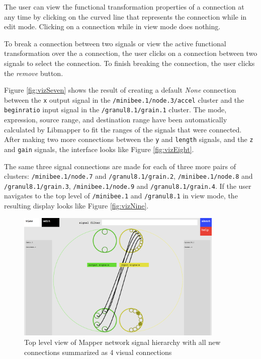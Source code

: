 The user can view the functional transformation properties of a connection at any time by clicking on the curved line that represents the connection while in edit mode. Clicking on a connection while in view mode does nothing.

To break a connection between two signals or view the active functional transformation over the a connection, the user clicks on a connection between two signals to select the connection. To finish breaking the connection, the user clicks the \emph{remove} button.

Figure \ref{fig:vizSeven} shows the result of creating a default \emph{None} connection between the \verb#x# output signal in the \verb#/minibee.1/node.3/accel# cluster and the \verb#beginratio# input signal in the \verb#/granul8.1/grain.1# cluster. The mode, expression, source range, and destination range have been automatically calculated by Libmapper to fit the ranges of the signals that were connected. After making two more connections between the \verb#y# and \verb#length# signals, and the \verb#z# and \verb#gain# signals, the interface looks like Figure \ref{fig:vizEight}.

The same three signal connections are made for each of three more pairs of clusters: \verb#/minibee.1/node.7# and \verb#/granul8.1/grain.2#, \verb#/minibee.1/node.8# and \verb#/granul8.1/grain.3#, \verb#/minibee.1/node.9# and \verb#/granul8.1/grain.4#. If the user navigates to the top level of \verb#/minibee.1# and \verb#/granul8.1# in view mode, the resulting display looks like Figure \ref{fig:vizNine}.

\begin{figure}[hp]
\centering
\includegraphics[width=0.88\textwidth]{vizmapperTen.png}
\caption{Top level view of Mapper network signal hierarchy with all new connections summarized as 4 visual connections}
\label{fig:vizTen}
\end{figure}

